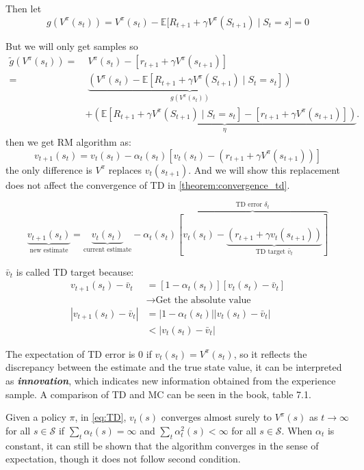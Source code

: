 \documentclass[10pt]{elegantbook}
\newcommand{\mydefination}[1]{\textbf{\textit{\textcolor{structurecolor}{#1}}}}
\begin{document}
Then let
\[ g(V^{\pi}(s_t)) = V^{\pi}(s_t) - \mathbb E \big [ R_{t+1} + \gamma V^{\pi}(S_{t+1}) \mid S_t = s \big ] = 0 \]

But we will only get samples so
\begin{align*}
    \tilde{g}(V^{\pi}(s_t)) =&\; V^{\pi}(s_t) - \left[ r_{t+1} + \gamma V^{\pi}(s_{t+1}) \right] \\
    =&\; \underbrace{\left( V^{\pi}(s_t) - \mathbb{E} \left[ R_{t+1} + \gamma V^{\pi}(S_{t+1}) \mid S_t = s_t \right] \right)}_{g(V^{\pi}(s_t))} \\
    &+ \underbrace{\left( \mathbb{E} \left[ R_{t+1} + \gamma V^{\pi}(S_{t+1}) \mid S_t = s_t \right] - \left[ r_{t+1} + \gamma V^{\pi}(s_{t+1}) \right] \right)}_{\eta}.
\end{align*}
then we get RM algorithm as:
\[ v_{t+1}(s_t) = v_t(s_t) - \alpha_t(s_t) [v_t(s_t) - (r_{t+1} + \gamma V^{\pi}(s_{t+1}))] \]
the only difference is $V^{\pi}$ replaces $v_t(s_{t+1})$. And we will show this replacement does not affect the convergence of TD in \ref{theorem:convergence_td}.

\[
    \underbrace{v_{t+1}(s_t)}_{\text{new estimate}} = \underbrace{v_t(s_t)}_{\text{current estimate}} - 
    \alpha_t(s_t) \overbrace{[v_t(s_t) - \underbrace{(r_{t+1} + \gamma v_t(s_{t+1}))}_{\text{TD target } \bar v_t}]}^{\text{TD error } \delta_t}
\]

$\bar v_t$ is called TD target because:
\begin{align*}
v_{t+1}(s_t) - \bar v_t &= [1 - \alpha_t(s_t)] [v_{t}(s_t) - \bar v_t] \\
                        &\rightarrow \text{Get the absolute value} \\
|v_{t+1}(s_t) - \bar v_t| &= |1 - \alpha_t(s_t)| |v_{t}(s_t) - \bar v_t| \\
                        & < |v_{t}(s_t) - \bar v_t|
\end{align*}

The expectation of TD error is 0 if $v_{t}(s_t) = V^{\pi}(s_t)$, so it reflects the discrepancy between the estimate and the true state value, it can be 
interpreted as \mydefination{innovation}, which indicates new information obtained from the experience sample. A comparison of TD and MC can be seen in the book,
table 7.1.

\begin{theorem}[Convergence of TD] \label{theorem:convergence_td}
    Given a policy $\pi$, in \ref{eq:TD}, $v_{t}(s)$ converges almost surely to $V^{\pi}(s)$ as $t \rightarrow \infty$ for all $s \in \mathcal S$ if 
    $\sum_t \alpha_t(s) = \infty$ and $\sum_t \alpha_t^2(s) < \infty$ for all $s \in \mathcal S$. When $\alpha_t$ is constant, it can still be shown that the 
    algorithm converges in the sense of expectation, though it does not follow second condition.
\end{theorem}
\end{document}
